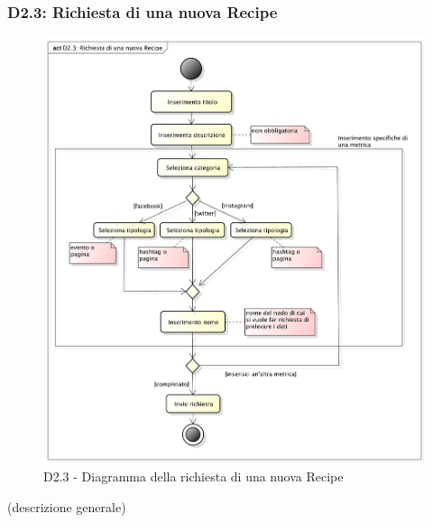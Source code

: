 		\subsubsection{D2.3: Richiesta di una nuova Recipe} %
		\label{ssub:richiesta_di_una_nuova_recipe}
		\begin{figure}[!htbp]
			\centering
			\centerline{\includegraphics[scale=0.45]{./images/D2_3.pdf}}
			\caption{D2.3 - Diagramma della richiesta di una nuova Recipe}
		\end{figure}
		\noindent
		[TO DO] (descrizione generale)

